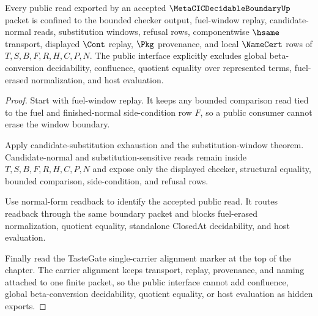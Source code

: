 \begin{theorem}
\label{thm:metacic-decidable-boundary-public-interface}
Every public read exported by an accepted $\MetaCICDecidableBoundaryUp$ packet is confined to the bounded checker output, fuel-window replay, candidate-normal reads, substitution windows, refusal rows, componentwise $\hsame$ transport, displayed $\Cont$ replay, $\Pkg$ provenance, and local $\NameCert$ rows of $T,S,B,F,R,H,C,P,N$. The public interface explicitly excludes global beta-conversion decidability, confluence, quotient equality over represented terms, fuel-erased normalization, and host evaluation.
\end{theorem}
\begin{proof}
Start with fuel-window replay. It keeps any bounded comparison read tied to the fuel and finished-normal side-condition row $F$, so a public consumer cannot erase the window boundary.

Apply candidate-substitution exhaustion and the substitution-window theorem. Candidate-normal and substitution-sensitive reads remain inside $T,S,B,F,R,H,C,P,N$ and expose only the displayed checker, structural equality, bounded comparison, side-condition, and refusal rows.

Use normal-form readback to identify the accepted public read. It routes readback through the same boundary packet and blocks fuel-erased normalization, quotient equality, standalone ClosedAt decidability, and host evaluation.

Finally read the TasteGate single-carrier alignment marker at the top of the chapter. The carrier alignment keeps transport, replay, provenance, and naming attached to one finite packet, so the public interface cannot add confluence, global beta-conversion decidability, quotient equality, or host evaluation as hidden exports.
\end{proof}

